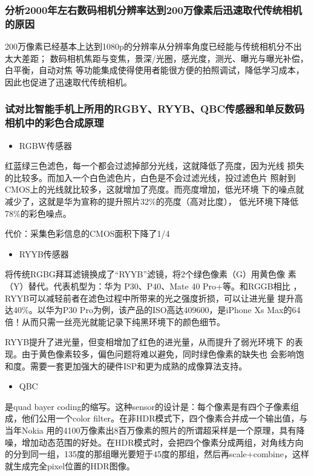 \documentclass[UTF8,a4paper,AutoFakeBold,AutoFakeSlant]{ctexart}
\begin{document}
\subsubsection{分析2000年左右数码相机分辨率达到200万像素后迅速取代传统相机的原因}

200万像素已经基本上达到1080p的分辨率从分辨率角度已经能与传统相机分不出太大差距；
数码相机焦距与变焦，景深/光圈，感光度，测光、曝光与曝光补偿，白平衡，自动对焦
等功能集成使得使用者能很方便的拍照调试，降低学习成本，因此也促进了迅速取代传统相机。


\subsubsection{试对比智能手机上所用的RGBY、RYYB、QBC传感器和单反数码相机中的彩色合成原理}

\begin{itemize}
  \item RGBW传感器
\end{itemize}

红蓝绿三色滤色，每一个都会过滤掉部分光线，这就降低了亮度，因为光线
损失的比较多。而加入一个白色滤色片，白色是不会过滤光线，投过滤色片
照射到CMOS上的光线就比较多，这就增加了亮度。而亮度增加，低光环境
下的噪点就减少了，这就是华为宣称的提升照片32\%的亮度（高对比度），
低光环境下降低78\%的彩色噪点。

代价：采集色彩信息的CMOS面积下降了1/4

\begin{itemize}
  \item RYYB传感器
\end{itemize}

将传统RGBG拜耳滤镜换成了“RYYB”滤镜，将2个绿色像素（G）用黄色像
素（Y）替代。代表机型为：华为 P30、P40、Mate 40 Pro+等。和RGGB相比
，RYYB可以减轻前者在滤色过程中所带来的光之强度折损，可以让进光量
提升高达40\%。以华为P30 Pro为例，该产品的ISO高达409600，是iPhone Xs
Max的64倍！从而只需一丝亮光就能记录下纯黑环境下的颜色细节。

RYYB提升了进光量，但变相增加了红色的进光量，从而提升了弱光环境下
的表现。由于黄色像素较多，偏色问题将难以避免，同时绿色像素的缺失也
会影响饱和度。需要一套更加强大的硬件ISP和更为成熟的成像算法支持。

\begin{itemize}
  \item QBC
\end{itemize}

是quad bayer
coding的缩写。这种sensor的设计是：每个像素是有四个子像素组成，他们公用一个color filter。在非HDR模式下，四个像素合并成一个输出值，与当年Nokia 用的4100万像素出8百万像素的照片的所谓超采样是一个原理，具有降噪，增加动态范围的好处。在HDR模式时，会把四个像素分成两组，对角线方向的分到同一组，135度的那组曝光要短于45度的那组，然后再scale+combine，这样就生成完全pixel位置的HDR图像。
\end{document}
